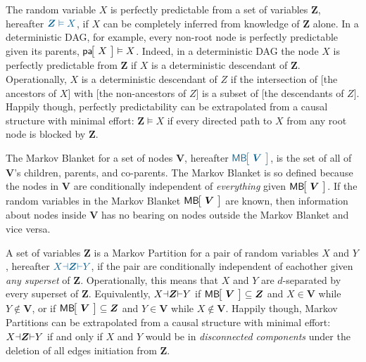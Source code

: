  The random variable $X$ is perfectly predictable from a set of variables $\bm{Z}$, hereafter $\mblue{\bm{Z}\vDash X}$, if $X$ can be completely inferred from knowledge of $\bm{Z}$ alone. In a deterministic DAG, for example, every non-root node is perfectly predictable given its parents, ${\NamedFunction{pa}{\!X\!}\vDash X}$. Indeed, in a deterministic DAG the node $X$ is perfectly predictable from $\bm{Z}$ if $X$ is a deterministic descendant of $\bm{Z}$. Operationally, $X$ is a deterministic descendant of $Z$ if the intersection of {[the ancestors of $X$]} with {[the non-ancestors of $Z$]} is a subset of {[the descendants of $Z$]}. Happily though, perfectly predictability can be extrapolated from a causal structure with minimal effort: ${\bm{Z}\vDash X}$ if every directed path to $X$ from any root node is blocked by $\bm{Z}$. 

 The Markov Blanket for a set of nodes $\bm{V}$, hereafter $\mblue{\NamedFunction{MB}{\!\bm{V}\!}}$, is the set of all of $\bm{V}$'s children, parents, and co-parents. The Markov Blanket is so defined because the nodes in $\bm{V}$ are conditionally independent of \emph{everything} given $\NamedFunction{MB}{\!\bm{V}\!}$. If the random variables in the Markov Blanket $\NamedFunction{MB}{\!\bm{V}\!}$ are known, then information about nodes inside $\bm{V}$ has no bearing on nodes outside the Markov Blanket and vice versa.

  A set of variables $\bm{Z}$ is a Markov Partition for a pair of random variables $X$ and $Y$, hereafter $\mblue{X\cramp{\dashv}\bm{Z}\cramp{\vdash}Y}$, if the pair are conditionally independent of eachother given \emph{any superset} of $\bm{Z}$. Operationally, this means that $X$ and $Y$ are $d$-separated by every superset of $\bm{Z}$. Equivalently, ${X\mathord{\dashv}\bm{Z}\mathord{\vdash}Y}$ if $\NamedFunction{MB}{\!\bm{V}\!}\subseteq \bm{Z}$ and $X\in \bm{V}$ while $Y\not\in \bm{V}$, or if $\NamedFunction{MB}{\!\bm{V}\!}\subseteq \bm{Z}$ and $Y\in \bm{V}$ while $X\not\in \bm{V}$. Happily though, Markov Partitions can be extrapolated from a causal structure with minimal effort: ${X\mathord{\dashv}\bm{Z}\mathord{\vdash}Y}$ if and only if $X$ and $Y$ would be in \emph{disconnected components} under the deletion of all edges initiation from $\bm{Z}$. 

